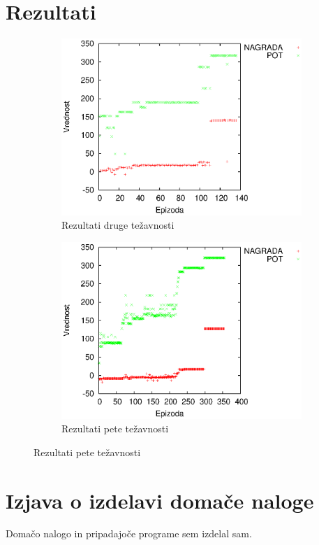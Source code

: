 \documentclass[a4paper,11pt]{article}
\begin{document}
\section{Rezultati}
\begin{figure}[h]
    \centering
    \begin{subfigure}[b]{0.45\textwidth}
        \centering
        \includegraphics[width=\textwidth]{images/level2.eps}
        \caption{Rezultati druge težavnosti}
    \end{subfigure}
    \begin{subfigure}[b]{0.45\textwidth}
        \centering
        \includegraphics[width=\textwidth]{images/level5.eps}
        \caption{Rezultati pete težavnosti}
    \end{subfigure}
\end{figure}        
\pagebreak

\section{Izjava o izdelavi domače naloge}
Domačo nalogo in pripadajoče programe sem izdelal sam.
\end{document}
